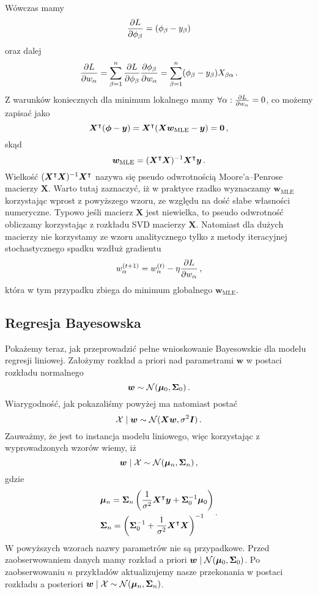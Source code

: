 \documentclass{myclass}
\begin{document}
Wówczas mamy
\[
    \pdv{L}{\phi_\beta} = (\phi_\beta - y_\beta)
\]
oraz dalej
\[
    \pdv{L}{w_\alpha} = \sum_{\beta=1}^n \pdv{L}{\phi_\beta} \pdv{\phi_\beta}{w_\alpha} = \sum_{\beta=1}^n (\phi_\beta - y_\beta) X_{\beta\alpha}\,.
\]
Z warunków koniecznych dla minimum lokalnego mamy \(\forall \alpha : \pdv{L}{w_\alpha} = 0\), co
możemy zapisać jako
\[
    \bm{X}^\intercal(\bm{\phi} - \bm{y}) = \bm{X}^\intercal(\bm{X}\bm{w}_\text{MLE} - \bm{y}) = \bm{0}\,,
\]
skąd
\[
    \bm{w}_\text{MLE} = (\bm{X}^\intercal \bm{X})^{-1} \bm{X}^\intercal \bm{y}\,.
\]
Wielkość \((\bm{X}^\intercal \bm{X})^{-1} \bm{X}^\intercal\) nazywa się pseudo odwrotnością
Moore'a--Penrose macierzy \(\bm{X}\). Warto tutaj zaznaczyć, iż w praktyce rzadko wyznaczamy
\(\bm{w}_\text{MLE}\) korzystając wprost z powyższego wzoru, ze względu na dość słabe własności
numeryczne. Typowo jeśli macierz \(\bm{X}\) jest niewielka, to pseudo odwrotność obliczamy
korzystając z rozkładu SVD macierzy \(\bm{X}\). Natomiast dla dużych macierzy nie korzystamy ze
wzoru analitycznego tylko z metody iteracyjnej stochastycznego spadku wzdłuż gradientu
\[
    w_\alpha^{(t+1)} = w_\alpha^{(t)} - \eta \pdv{L}{w_\alpha}\,,
\]
która w tym przypadku zbiega do minimum globalnego \(\bm{w}_\text{MLE}\).


\subsection{Regresja Bayesowska}

Pokażemy teraz, jak przeprowadzić pełne wnioskowanie Bayesowskie dla modelu regresji liniowej.
Założymy rozkład a priori nad parametrami \(\bm{w}\) w postaci rozkładu normalnego
\[
    \bm{w} \sim \mathcal{N}(\bm{\mu}_0, \bm{\Sigma}_0)\,.
\]
Wiarygodność, jak pokazaliśmy powyżej ma natomiast postać
\[
    \mathcal{X} \mid \bm{w} \sim \mathcal{N}(\bm{X}\bm{w}, \sigma^2 \bm{I})\,.
\]
Zauważmy, że jest to instancja modelu liniowego, więc korzystając z wyprowadzonych wzorów wiemy, iż
\[
    \bm{w} \mid \mathcal{X} \sim \mathcal{N}(\bm{\mu}_n, \bm{\Sigma}_n)\,,
\]
gdzie
\[
\begin{split}
    &\bm{\mu}_n = \bm{\Sigma}_n\left(\frac{1}{\sigma^2} \bm{X}^\intercal \bm{y} + \bm{\Sigma}_0^{-1}\bm{\mu}_0 \right)\\
    &\bm{\Sigma}_n = \left(\bm{\Sigma}_0^{-1} + \frac{1}{\sigma^2} \bm{X}^\intercal \bm{X} \right)^{-1}
\end{split}\,.
\] 
W powyższych wzorach nazwy parametrów nie są przypadkowe. Przed zaobserwowaniem danych mamy rozkład
a priori \(\bm{w} \mid \mathcal{N}(\bm{\mu}_0, \bm{\Sigma}_0)\). Po zaobserwowaniu \(n\) przykładów
aktualizujemy nasze przekonania w postaci rozkładu a posteriori \(\bm{w} \mid \mathcal{X} \sim
\mathcal{N}(\bm{\mu}_n, \bm{\Sigma}_n)\).
\end{document}
